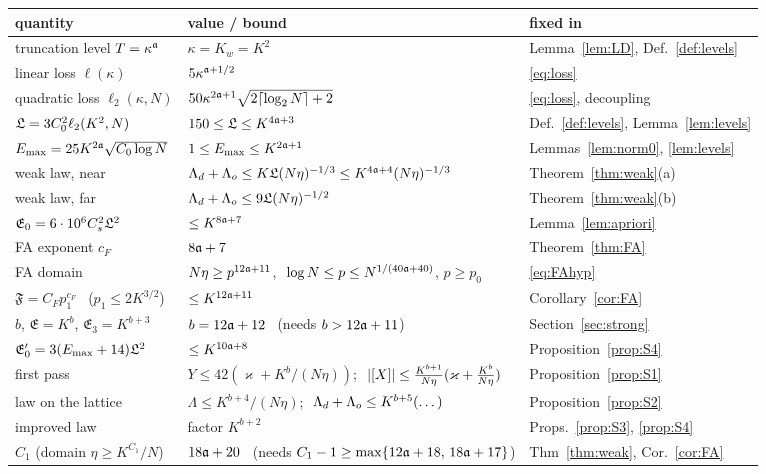 \begin{center}
\renewcommand{\arraystretch}{1.15}\small
\begin{tabular}{|p{}|p{}|p{}|}
\hline
quantity & value / bound & fixed in\\\hline
truncation level $T=\kappa^{\mathfrak{a}}$ & $\kappa=K_w=K^2$ & Lemma~\ref{lem:LD}, Def.~\ref{def:levels}\\
linear loss $\ell(\kappa)$ & $5\kappa^{\mathfrak{a}+1/2}$ & \eqref{eq:loss}\\
quadratic loss $\ell_2(\kappa,N)$ & $50\kappa^{2\mathfrak{a}+1}\sqrt{2\lceil\log_2N\rceil+2}$ & \eqref{eq:loss}, decoupling\\
$\mathfrak{L}=3C_0^2\ell_2(K^2,N)$ & $150\le\mathfrak{L}\le K^{4\mathfrak{a}+3}$ & Def.~\ref{def:levels}, Lemma~\ref{lem:levels}\\
$E_{\max}=25K^{2\mathfrak{a}}\sqrt{C_0\log N}$ & $1\le E_{\max}\le K^{2\mathfrak{a}+1}$ & Lemmas~\ref{lem:norm0}, \ref{lem:levels}\\
weak law, near & $\Lambda_d+\Lambda_o\le K\mathfrak{L}(N\eta)^{-1/3}\le K^{4\mathfrak{a}+4}(N\eta)^{-1/3}$ & Theorem~\ref{thm:weak}(a)\\
weak law, far & $\Lambda_d+\Lambda_o\le9\mathfrak{L}(N\eta)^{-1/2}$ & Theorem~\ref{thm:weak}(b)\\
$\mathfrak E_0=6\cdot10^6C_s^2\mathfrak{L}^2$ & $\le K^{8\mathfrak{a}+7}$ & Lemma~\ref{lem:apriori}\\
FA exponent $c_F$ & $8\mathfrak{a}+7$ & Theorem~\ref{thm:FA}\\
FA domain & $N\eta\ge p^{12\mathfrak{a}+11}$, $\ \log N\le p\le N^{1/(40\mathfrak{a}+40)}$, $p\ge p_0$ & \eqref{eq:FAhyp}\\
$\mathfrak F=C_Fp_1^{c_F}$ \ ($p_1\le2K^{3/2}$) & $\le K^{12\mathfrak{a}+11}$ & Corollary~\ref{cor:FA}\\
$b$, $\mathfrak E=K^b$, $\mathfrak E_3=K^{b+3}$ & $b=12\mathfrak{a}+12$ \ (needs $b>12\mathfrak{a}+11$) & Section~\ref{sec:strong}\\
$\mathfrak E_0'=3(E_{\max}+14)\mathfrak{L}^2$ & $\le K^{10\mathfrak{a}+8}$ & Proposition~\ref{prop:S4}\\
first pass & $Y\le42(\varkappa+K^b/(N\eta))$; $\ |[X]|\le\frac{K^{b+1}}{N\eta}(\varkappa+\frac{K^b}{N\eta})$ & Proposition~\ref{prop:S1}\\
law on the lattice & $\Lambda\le K^{b+4}/(N\eta)$; $\ \Lambda_d+\Lambda_o\le K^{b+5}(\dots)$ & Proposition~\ref{prop:S2}\\
improved law & factor $K^{b+2}$ & Props.~\ref{prop:S3}, \ref{prop:S4}\\
$C_1$ (domain $\eta\ge K^{C_1}/N$) & $18\mathfrak{a}+20$ \ (needs $C_1-1\ge\max\{12\mathfrak{a}+18,\,18\mathfrak{a}+17\}$) & Thm~\ref{thm:weak}, Cor.~\ref{cor:FA}\\

\end{tabular}
\end{center}
